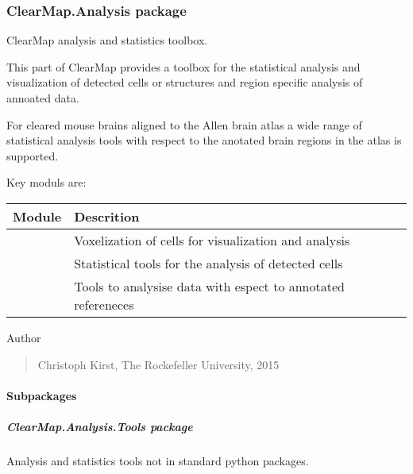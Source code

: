 \documentclass[letterpaper,10pt,english]{sphinxmanual}
\begin{document}
\subsubsection{ClearMap.Analysis package}
\label{api/ClearMap.Analysis:clearmap-analysis-package}\label{api/ClearMap.Analysis::doc}\label{api/ClearMap.Analysis:module-ClearMap.Analysis}
ClearMap analysis and statistics toolbox.

This part of ClearMap provides a toolbox for the statistical analysis and
visualization of detected cells or structures and region specific analysis
of annoated data.

For cleared mouse brains aligned to the Allen brain atlas a wide range of
statistical analysis tools with respect to the anotated brain regions in
the atlas is supported.

Key moduls are:

\begin{tabulary}{\linewidth}{|L|L|}
\hline
\textsf{\relax 
Module
} & \textsf{\relax 
Descrition
}\\
\hline
{\hyperref[api/ClearMap.Analysis:module-ClearMap.Analysis.Voxelization]{\emph{}}}
 & 
Voxelization of cells for visualization and analysis
\\
\hline
{\hyperref[api/ClearMap.Analysis:module-ClearMap.Analysis.Statistics]{\emph{}}}
 & 
Statistical tools for the analysis of detected cells
\\
\hline
{\hyperref[api/ClearMap.Analysis:module-ClearMap.Analysis.Label]{\emph{}}}
 & 
Tools to analysise data with espect to annotated refereneces
\\
\hline\end{tabulary}


Author
\begin{quote}

Christoph Kirst, The Rockefeller University, 2015
\end{quote}


\paragraph{Subpackages}
\label{api/ClearMap.Analysis:subpackages}

\subparagraph{ClearMap.Analysis.Tools package}
\label{api/ClearMap.Analysis.Tools:clearmap-analysis-tools-package}\label{api/ClearMap.Analysis.Tools:module-ClearMap.Analysis.Tools}\label{api/ClearMap.Analysis.Tools::doc}
Analysis and statistics tools not in standard python packages.
\end{document}
